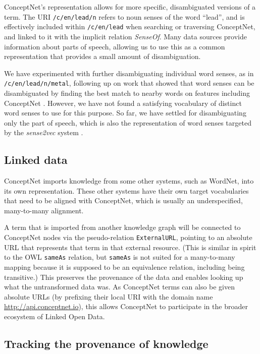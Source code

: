 \documentclass[letterpaper]{article}
\begin{document}
ConceptNet's representation allows for more specific, disambiguated
versions of a term. The URI \texttt{/c/en/lead/n} refers to noun senses
of the word ``lead'', and is effectively included within
\texttt{/c/en/lead} when searching or traversing ConceptNet, and
linked to it with the implicit relation \emph{SenseOf}. Many data
sources provide information about parts of speech, allowing us to use
this as a common representation that provides a small amount of
disambiguation.

We have experimented with further disambiguating individual word senses, as in
\texttt{/c/en/lead/n/metal}, following up on work that showed that word senses
can be disambiguated by finding the best match to nearby words on features
including ConceptNet \cite{havasi2010coarse}. However, we have not found a
satisfying vocabulary of distinct word senses to use for this purpose. So far,
we have settled for disambiguating only the part of speech, which is also the
representation of word senses targeted by the \emph{sense2vec} system
\cite{trask2015sense2vec}.

\subsection{Linked data}

ConceptNet imports knowledge from some other systems, such as WordNet, into its
own representation. These other systems have their own target vocabularies that
need to be aligned with ConceptNet, which is usually an underspecified,
many-to-many alignment.

A term that is imported from another knowledge graph will be connected to
ConceptNet nodes via the pseudo-relation \texttt{ExternalURL}, pointing to an
absolute URL that represents that term in that external resource. (This is
similar in spirit to the OWL \texttt{sameAs} relation, but \texttt{sameAs} is
not suited for a many-to-many mapping because it is supposed to be an
equivalence relation, including being transitive.) This preserves the
provenance of the data and enables looking up what the untransformed data was.
As ConceptNet terms can also be given absolute URLs (by prefixing their local
URI with the domain name \url{http://api.conceptnet.io}), this allows
ConceptNet to participate in the broader ecosystem of Linked Open Data.

\subsection{Tracking the provenance of knowledge}\label{provenance}
\end{document}
